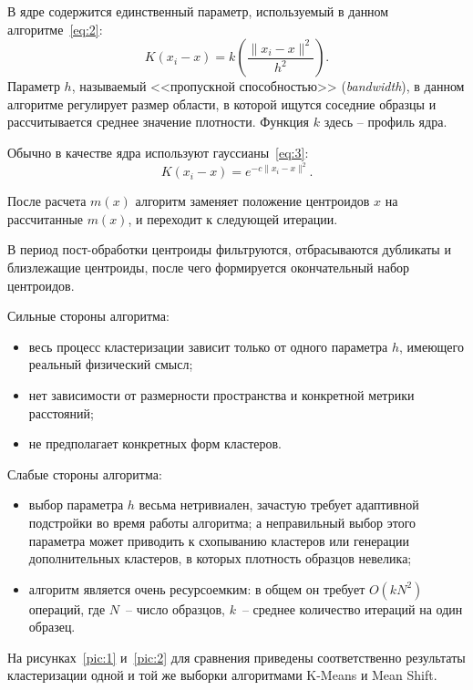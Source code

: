 В ядре содержится единственный параметр, используемый в данном ал\-го\-рит\-ме~\eqref{eq:2}:
\begin{equation}
    K(x_i - x) = k\left( \frac{\|x_i - x\|^2}{h^2} \right).
    \label{eq:2}
\end{equation}
Параметр \( h \), называемый <<пропускной способностью>> (\emph{bandwidth}), в данном
ал\-го\-рит\-ме регулирует размер области, в которой ищутся соседние образцы и рассчитывается
среднее значение плотности. Функция \( k \) здесь -- профиль ядра.

Обычно в качестве ядра используют гауссианы~\eqref{eq:3}:
\begin{equation}
    K(x_i - x) = e^{-c\|x_i - x\|^2}.
    \label{eq:3}
\end{equation}

После расчета \( m(x) \) алгоритм заменяет положение центроидов \( x \) на рас\-счи\-тан\-ные
\( m(x) \), и переходит к следующей итерации.

В период пост-обработки центроиды фильтруются, отбрасываются дуб\-ли\-ка\-ты и близлежащие
центроиды, после чего формируется окончательный набор центроидов.~\cite{vorontsov, ms, ms2}

Сильные стороны алгоритма:
\begin{itemize}
    \item весь процесс кластеризации зависит только от одного параметра \( h \), имеющего реальный
        физический смысл;
    \item нет зависимости от размерности пространства и конкретной метрики расстояний;
    \item не предполагает конкретных форм кластеров.
\end{itemize}

Слабые стороны алгоритма:
\begin{itemize}
    \item выбор параметра \( h \) весьма нетривиален, зачастую требует адаптивной подстройки во
        время работы алгоритма; а неправильный выбор этого параметра может приводить к схопыванию
        кластеров или генерации дополнительных кластеров, в которых плотность образцов невелика;
    \item алгоритм является очень ресурсоемким: в общем он требует \( O(kN^2) \) операций, где
        \( N \)~-- число образцов, \( k \)~-- среднее количество итераций на один образец.
\end{itemize}

На рисунках~\ref{pic:1} и~\ref{pic:2} для сравнения приведены соответственно результаты
кластеризации одной и той же выборки алгоритмами K-Means и Mean Shift.

